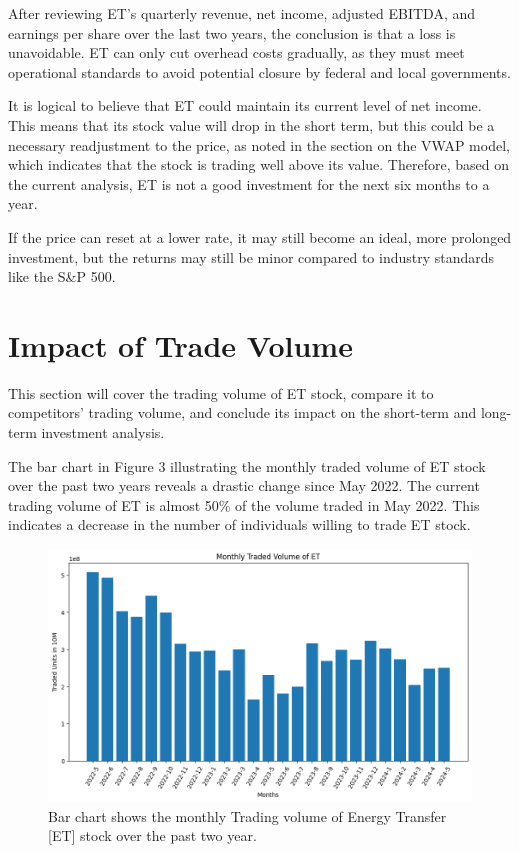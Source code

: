 \documentclass[9pt,a4paper,twoside]{tau}
\begin{document}
    After reviewing ET's quarterly revenue, net income, adjusted EBITDA, and earnings per share over the last two years, the conclusion is that a loss is unavoidable. ET can only cut overhead costs gradually, as they must meet operational standards to avoid potential closure by federal and local governments.

    It is logical to believe that ET could maintain its current level of net income. This means that its stock value will drop in the short term, but this could be a necessary readjustment to the price, as noted in the section on the VWAP model, which indicates that the stock is trading well above its value. Therefore, based on the current analysis, ET is not a good investment for the next six months to a year.
    
    If the price can reset at a lower rate, it may still become an ideal, more prolonged investment, but the returns may still be minor compared to industry standards like the S\&P 500.

\section{Impact of Trade Volume}

    This section will cover the trading volume of ET stock, compare it to competitors' trading volume, and conclude its impact on the short-term and long-term investment analysis.

    The bar chart in Figure 3 illustrating the monthly traded volume of ET stock over the past two years reveals a drastic change since May 2022. The current trading volume of ET is almost 50\% of the volume traded in May 2022. This indicates a decrease in the number of individuals willing to trade ET stock. 
    
    \begin{figure}[H]
        \centering
        \includegraphics[width=0.85\columnwidth]{Figures/MonthlyTradedVolumeOfET.png}
        \caption{Bar chart shows the monthly Trading volume of Energy Transfer [ET] stock over the past two year\cite{yahoo-finance-2024}.}
        \label{fig:figure}
    \end{figure}
\end{document}
